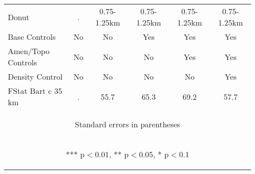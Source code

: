 \begin{tabular}{lccccc}
Donut & . & 0.75-1.25km & 0.75-1.25km & 0.75-1.25km & 0.75-1.25km \\
Base Controls & No & No & Yes & Yes & Yes \\
Amen/Topo Controls & No & No & No & Yes & Yes \\
Density Control & No & No & No & No & Yes \\
 FStat Bart c 35 km & . & 55.7 & 65.3 & 69.2 & 57.7 \\ \hline
\multicolumn{6}{c}{\begin{footnotesize} Standard errors in parentheses\end{footnotesize}} \\
\multicolumn{6}{c}{\begin{footnotesize} *** p$<$0.01, ** p$<$0.05, * p$<$0.1\end{footnotesize}} \\
\end{tabular}

